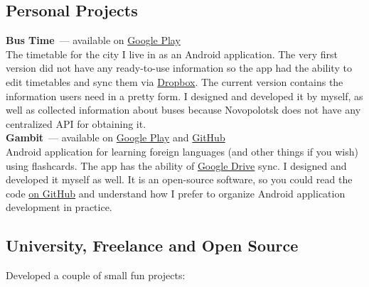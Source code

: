     \subsection*{Personal Projects}

      \textbf{Bus Time}~--- available on \href{https://play.google.com/store/apps/details?id=ru.ming13.bustime}{Google Play} \\

        The timetable for the city I live in as an Android application.
        The very first version did not have any ready-to-use information so the app
        had the ability to edit timetables and sync them via
        \href{https://dropbox.com}{Dropbox}. The current version contains
        the information users need in a pretty form. I designed and developed
        it by myself, as well as collected information about buses because Novopolotsk
        does not have any centralized API for obtaining it. \\

      \textbf{Gambit}~--- available on \href{https://play.google.com/store/apps/details?id=ru.ming13.gambit}{Google Play}
        and \href{https://github.com/ming13/gambit}{GitHub} \\

        Android application for learning foreign languages
        (and other things if you wish) using flashcards.
        The app has the ability of \href{https://drive.google.com}{Google Drive} sync.
        I designed and developed
        it myself as well. It is an open-source software, so you could read the code
        \href{https://github.com/ming13/gambit}{on GitHub} and understand
        how I prefer to organize Android application development in practice.

    \clearpage

    \subsection*{University, Freelance and Open Source}

      Developed a couple of small fun projects:

